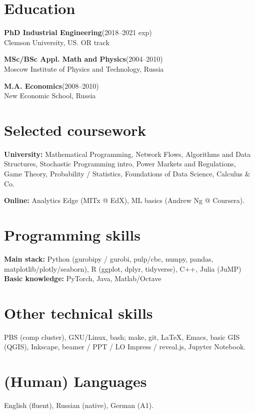 \documentclass[11pt]{article} \usepackage{geometry} %
\newcommand{\edu}[3]{
  \textbf{#1}\hfill (#2)\\
  #3\vspace{0.7em}}
\begin{document}
 
 \noindent
 \begin{minipage}[t]{0.49\textwidth}
   \section*{Education} 
   \edu{PhD Industrial Engineering}{2018--2021 exp}{
     Clemson University, US. OR track}

   \edu{MSc/BSc Appl. Math and Physics}{2004--2010}{
   Moscow Institute of Physics and Technology, Russia}

   \edu{M.A. Economics}{2008--2010}{
   New Economic School, Russia}
 \section*{Selected coursework}
 \textbf{University:} Mathematical Programming, Network Flows, Algorithms and Data Structures,
 Stochastic Programming intro, Power Markets and Regulations, Game Theory,
 Probability / Statistics, Foundations of Data Science, Calculus \& Co.\vspace{0.5em}

 \textbf{Online:} Analytics Edge (MITx @ EdX), ML basics (Andrew Ng @ Coursera).\\
   \section*{Programming skills}
   \textbf{Main stack:} Python (gurobipy / gurobi, pulp/cbc, numpy, pandas,
   matplotlib/plotly/seaborn), R (ggplot, dplyr, tidyverse), C++, Julia (JuMP)\\
   \textbf{Basic knowledge:} PyTorch, Java, Matlab/Octave\\
   \section*{Other technical skills}
   PBS (comp cluster), GNU/Linux, bash; make, git, \LaTeX, Emacs, basic GIS
   (QGIS), Inkscape, beamer / PPT / LO Impress / reveal.js, Jupyter Notebook.
   \vspace{0.5em}

   \section*{(Human) Languages}
   English (fluent), Russian (native), German (A1).
 \end{minipage}\hfill%
\end{document}
